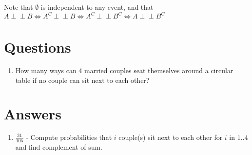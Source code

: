 \documentclass[12pt]{article}
\let\oldperp\perp
\renewcommand{\perp}[0]{\oldperp\!\!\!\oldperp}
\begin{document}
Note that $\emptyset$ is independent to any event, and that \\
$A \perp B \Leftrightarrow A^C \perp B \Leftrightarrow A^C \perp B^C \Leftrightarrow A \perp B^C$

\newpage
\section{Questions}
\begin{enumerate}
	\item How many ways can 4 married couples seat themselves around a circular table if no couple can sit next to each other?
\end{enumerate}

\newpage 
\section{Answers}
\begin{enumerate}
	\item $\frac{31}{105}$ - Compute probabilities that $i$ couple(s) sit next to each other for $i$ in $1..4$ and find complement of sum.
\end{enumerate}
\end{document}
